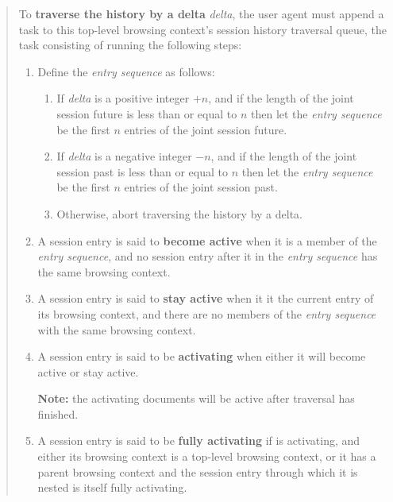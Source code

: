\documentclass{notes}
\begin{document}
\begin{quote}
  To \textbf{traverse the history by a delta} \emph{delta}, the user
  agent must append a task to this top-level browsing context's session
  history traversal queue, the task consisting of running the following
  steps:
  \begin{enumerate}
  \item Define the \emph{entry sequence}
    as follows:
    \begin{enumerate}

    \item If \emph{delta} is a positive integer $+n$, and if the length of the
      joint session future is less than or equal to $n$ then let the \emph{entry sequence}
      be the first $n$ entries of the joint session future.

    \item If \emph{delta} is a negative integer $-n$, and if the length of the
      joint session past is less than or equal to $n$ then let the \emph{entry sequence}
      be the first $n$ entries of the joint session past.

    \item Otherwise, abort traversing the history by a delta.

    \end{enumerate}

  \item A session entry is said to \textbf{become active} when
    it is a member of the \emph{entry sequence}, and no
    session entry after it in the \emph{entry sequence} has the same
    browsing context.

  \item A session entry is said to \textbf{stay active} when it it the
    current entry of its browsing context, and there are no members of
    the \emph{entry sequence} with the same browsing context.

  \item A session entry is said to be \textbf{activating} when either
    it will become active or stay active.

    \textbf{Note:} the activating documents
    will be active after traversal has finished.
    
  \item A session entry is said to be \textbf{fully activating} if
    is activating, and either its browsing context is a top-level
    browsing context, or it has a parent browsing context
    and the session entry through which it is nested is itself fully activating.
    

\end{enumerate}
\end{quote}
\end{document}
